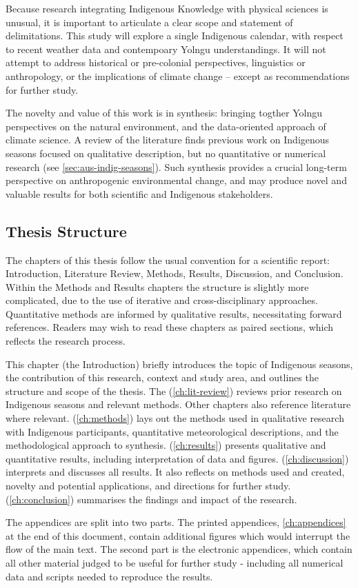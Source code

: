 Because research integrating Indigenous Knowledge with physical sciences is
unusual, it is important to articulate a clear scope and statement of delimitations.
This study will explore a single Indigenous calendar, with respect to recent weather data
and contempoary Yolngu understandings.  It will not attempt to address historical
or pre-colonial perspectives, linguistics or anthropology, or the implications
of climate change -- except as recommendations for further study.

The novelty and value of this work is in synthesis: bringing
togther Yolngu perspectives on the natural environment, and the
data-oriented approach of climate science.  A review of the literature
finds previous work on Indigenous seasons focused on qualitative description, but
no quantitative or numerical research (see \cref{sec:aus-indig-seasons}).
Such synthesis provides a crucial long-term perspective on
anthropogenic environmental change, and may produce novel and valuable
results for both scientific and Indigenous stakeholders.



\subsection*{Thesis Structure}

The chapters of this thesis follow the usual convention for a scientific
report: Introduction, Literature Review, Methods, Results, Discussion,
and Conclusion.  Within the Methods and Results chapters
the structure is slightly more complicated, due to the use of iterative and
cross-disciplinary approaches.  Quantitative methods are informed by
qualitative results, necessitating forward references.  Readers may wish
to read these chapters as paired sections, which reflects the research
process.

This chapter (the Introduction) briefly introduces the topic of
Indigenous seasons, the contribution of this research, context and
study area, and outlines the structure and scope of the thesis.
The  (\cref{ch:lit-review}) reviews prior research
on Indigenous seasons and relevant methods.  Other chapters
also reference literature where relevant.
 (\cref{ch:methods}) lays out the methods used in
qualitative research with Indigenous participants, quantitative meteorological
descriptions, and the methodological approach to synthesis.
 (\cref{ch:results}) presents qualitative and
quantitative results, including interpretation of data and figures.
 (\cref{ch:discussion}) interprets and discusses
all results.  It also reflects on methods used and created, novelty and
potential applications, and directions for further study.
 (\cref{ch:conclusion}) summarises the findings
and impact of the research.

The appendices are split into two parts.  The printed appendices,
\cref{ch:appendices} at the end of this document, contain additional figures
which would interrupt the flow of the main text.  The second part
is the electronic appendices, which contain all other material judged to
be useful for further study - including all numerical data and scripts
needed to reproduce the results.

